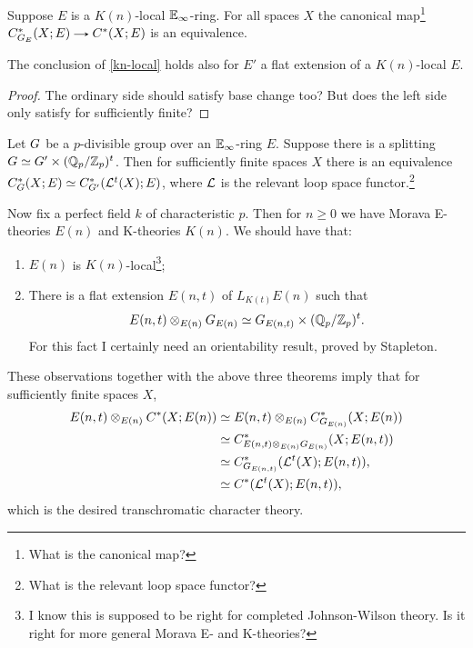 \begin{theorem}
  \label{kn-local}
  Suppose $E$ is a $K(n)$-local $\mathbb{E}_\infty$-ring. For all spaces $X$
  the canonical map\footnote{What is the canonical map?}
  $C_{\G_E}^*(X;E) \to C^*(X;E)$ is an equivalence.
\end{theorem}

\begin{corollary}
  The conclusion of \eqref{kn-local} holds also for $E'$ a flat
  extension of a $K(n)$-local $E$.
\end{corollary}

\begin{proof}
  The ordinary side should satisfy base change too? But does the left
  side only satisfy for sufficiently finite?
\end{proof}

\begin{theorem}
  \label{splitting}
  Let $G$ be a $p$-divisible group over an $\mathbb{E}_\infty$-ring
  $E$. Suppose there is a splitting
  $G \simeq G' \times (\mathbb{Q}_p/\mathbb{Z}_p)^t$. Then for sufficiently finite
  spaces $X$ there is an equivalence
  $C_G^*(X;E) \simeq C_{G'}^*(\mathcal{L}^t(X);E)$, where $\mathcal{L}$ is the relevant
  loop space functor.\footnote{What is the relevant loop space
    functor?}
\end{theorem}

Now fix a perfect field $k$ of characteristic $p$. Then for $n \ge 0$
we have Morava E-theories $E(n)$ and K-theories $K(n)$. We should have
that:
\begin{enumerate}
\item $E(n)$ is $K(n)$-local\footnote{I know this is supposed to be
    right for completed Johnson-Wilson theory. Is it right for more
    general Morava E- and K-theories?};
\item There is a flat extension $E(n,t)$ of $L_{K(t)}E(n)$ such that
  \[
  E(n,t) \otimes_{E(n)}G_{E(n)} \simeq G_{E(n,t)} \times (\mathbb{Q}_p/\mathbb{Z}_p)^t.
  \]
  For this fact I certainly need an orientability result, proved by
  Stapleton.
\end{enumerate}
These observations together with the above three theorems imply that
for sufficiently finite spaces $X$,
\begin{align*}
  E(n,t) \otimes_{E(n)} C^*(X;E(n))
  & \simeq E(n,t) \otimes_{E(n)} C_{G_{E(n)}}^*(X;E(n)) \\
  & \simeq C_{E(n,t) \otimes_{E(n)} G_{E(n)}}^*(X;E(n,t)) \\
  & \simeq C_{G_{E(n,t)}}^*(\mathcal{L}^t(X);E(n,t)), \\
  & \simeq C^*(\mathcal{L}^t(X);E(n,t)),
\end{align*}
which is the desired transchromatic character theory.

